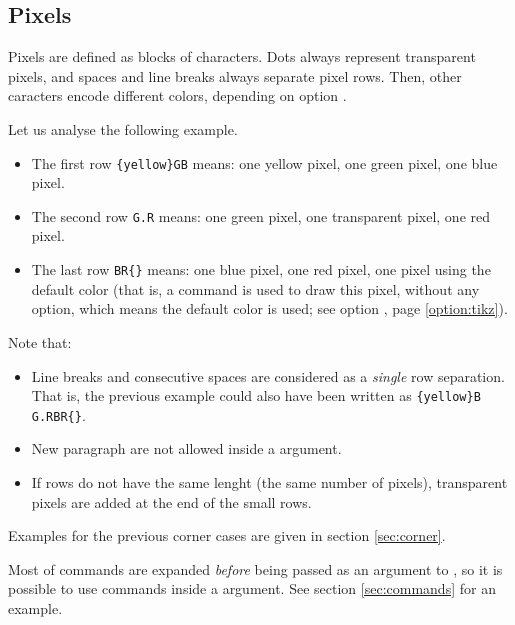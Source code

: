 \documentclass[
  load-preamble-,
  babel-options=english,
  add-index=true,
]{cnltx-doc}
\begin{document}
\subsection{Pixels}
\label{sec:pixels}

Pixels are defined as blocks of characters. Dots always represent transparent pixels, and spaces and line breaks always separate pixel rows. Then, other caracters encode different colors, depending on option .

Let us analyse the following example.

\begin{sidebyside}
\end{sidebyside}

\begin{itemize}
  \item The first row \texttt{\{yellow\}GB} means: one yellow pixel, one green pixel, one blue pixel.
  \item The second row \texttt{G.R} means: one green pixel, one transparent pixel, one red pixel.
  \item The last row \texttt{BR\{\}} means: one blue pixel, one red pixel, one pixel using the default  color (that is, a  command is used to draw this pixel, without any  option, which means the default  color is used; see option , page \ref{option:tikz}).
\end{itemize}

Note that:
\begin{itemize}
  \item Line breaks and consecutive spaces are considered as a \emph{single} row separation. That is, the previous example could also have been written as \texttt{\{yellow\}B G.R\hspace{1cm}BR\{\}}.
  \item New paragraph are not allowed inside a  argument.
  \item If rows do not have the same lenght (the same number of pixels), transparent pixels are added at the end of the small rows.
\end{itemize}

Examples for the previous corner cases are given in section \ref{sec:corner}.

Most of commands are expanded \emph{before} being passed as an argument to , so it is possible to use commands inside a  argument. See section \ref{sec:commands} for an example.
\end{document}
